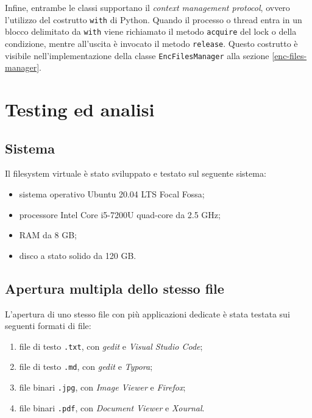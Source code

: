 \documentclass[a4paper,12pt,twoside,openright]{report}
\begin{document}
  Infine, entrambe le classi supportano il \textit{context management protocol}, ovvero 
  l'utilizzo del costrutto \texttt{with} di Python. Quando il processo o thread entra in un blocco
  delimitato da \texttt{with} viene richiamato il metodo \texttt{acquire} del lock o della condizione,
  mentre all'uscita è invocato il metodo \texttt{release}.
  Questo costrutto è visibile nell'implementazione della classe \texttt{EncFilesManager} alla sezione
  \ref{enc-files-manager}.



  \chapter{Testing ed analisi}
  \thispagestyle{fancy}

  \section{Sistema}

  Il filesystem virtuale è stato sviluppato e testato sul seguente sistema:

  \begin{itemize}
    \item sistema operativo Ubuntu 20.04 LTS Focal Fossa;
    \item processore Intel Core i5-7200U quad-core da 2.5 GHz;
    \item RAM da 8 GB;
    \item disco a stato solido da 120 GB.
  \end{itemize}

  \section{Apertura multipla dello stesso file}

  L'apertura di uno stesso file con più applicazioni dedicate è stata testata sui seguenti
  formati di file:

  \begin{enumerate}
    \item file di testo \texttt{.txt}, con \textit{gedit} e \textit{Visual Studio Code};
    \item file di testo \texttt{.md}, con \textit{gedit} e \textit{Typora};
    \item file binari \texttt{.jpg}, con \textit{Image Viewer} e \textit{Firefox};
    \item file binari \texttt{.pdf}, con \textit{Document Viewer} e \textit{Xournal}.
  \end{enumerate}
\end{document}
